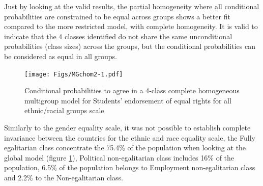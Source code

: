 \documentclass[12pt,a4paper,oneside]{reedthesis}
\begin{document}
Just by looking at the valid results, the partial homogeneity where all conditional probabilities are constrained to be equal across groups shows a better fit compared to the more restricted model, with complete homogeneity. It is valid to indicate that the 4 classes identified do not share the same unconditional probabilities (class sizes) across the groups, but the conditional probabilities can be considered as equal in all groups.
\begin{figure}
\centering
\texttt{[image: Figs/MGchom2-1.pdf]}
\caption{\label{fig:MGchom2}Conditional probabilities to agree in a 4-class complete homogeneous multigroup model for Students' endorsement of equal rights for all ethnic/racial groups scale}
\end{figure}
Similarly to the gender equality scale, it was not possible to establish complete invariance between the countries for the ethnic and race equality scale, the Fully egalitarian class concentrate the 75.4\% of the population when looking at the global model (figure \ref{fig:MGchom2}), Political non-egalitarian class includes 16\% of the population, 6.5\% of the population belongs to Employment non-egalitarian class and 2.2\% to the Non-egalitarian class.
\end{document}
